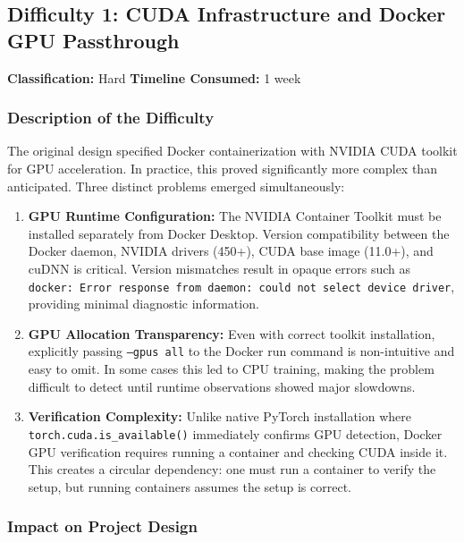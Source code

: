\subsection{Difficulty 1: CUDA Infrastructure and Docker GPU Passthrough}

\textbf{Classification:} Hard \quad \textbf{Timeline Consumed:} 1 week

\subsubsection{Description of the Difficulty}

The original design specified Docker containerization with NVIDIA CUDA toolkit for GPU acceleration. In practice, this proved significantly more complex than anticipated. Three distinct problems emerged simultaneously:

\begin{enumerate}
    \item \textbf{GPU Runtime Configuration:} The NVIDIA Container Toolkit must be installed separately from Docker Desktop. Version compatibility between the Docker daemon, NVIDIA drivers (450+), CUDA base image (11.0+), and cuDNN is critical. Version mismatches result in opaque errors such as \texttt{docker: Error response from daemon: could not select device driver}, providing minimal diagnostic information.

    \item \textbf{GPU Allocation Transparency:} Even with correct toolkit installation, explicitly passing \texttt{--gpus all} to the Docker run command is non-intuitive and easy to omit. In some cases this led to CPU training, making the problem difficult to detect until runtime observations showed major slowdowns.

    \item \textbf{Verification Complexity:} Unlike native PyTorch installation where \texttt{torch.cuda.is\_available()} immediately confirms GPU detection, Docker GPU verification requires running a container and checking CUDA inside it. This creates a circular dependency: one must run a container to verify the setup, but running containers assumes the setup is correct.
\end{enumerate}

\subsubsection{Impact on Project Design}

